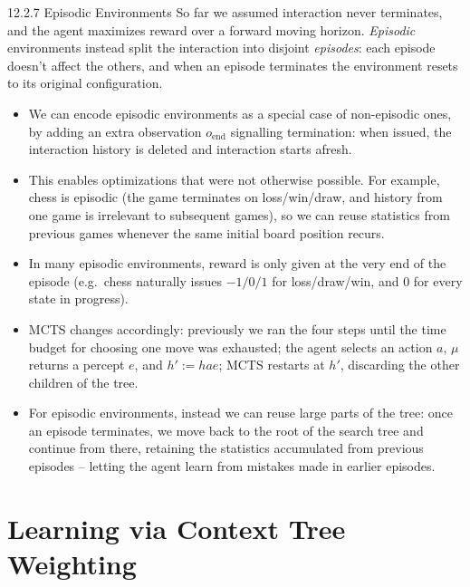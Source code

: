 \documentclass[aspectratio=169,10pt]{beamer}
\begin{document}
\begin{frame}{12.2.7 Episodic Environments}
So far we assumed interaction never terminates, and the agent maximizes reward over a
forward moving horizon. \emph{Episodic} environments instead split the interaction into
disjoint \emph{episodes}: each episode doesn't affect the others, and when an episode
terminates the environment resets to its original configuration.
\begin{itemize}
\item We can encode episodic environments as a special case of non-episodic ones, by
adding an extra observation $o_{\mathrm{end}}$ signalling termination: when issued, the
interaction history is deleted and interaction starts afresh.
\item This enables optimizations that were not otherwise possible. For example, chess is
episodic (the game terminates on loss/win/draw, and history from one game is irrelevant
to subsequent games), so we can reuse statistics from previous games whenever the same
initial board position recurs.
\item In many episodic environments, reward is only given at the very end of the episode
(e.g.\ chess naturally issues $-1/0/1$ for loss/draw/win, and $0$ for every state in
progress).
\item MCTS changes accordingly: previously we ran the four steps until the time budget for
choosing one move was exhausted; the agent selects an action $a$, $\mu$ returns a percept
$e$, and $h':=hae$; MCTS restarts at $h'$, discarding the other children of the tree.
\item For episodic environments, instead we can reuse large parts of the tree: once an
episode terminates, we move back to the root of the search tree and continue from there,
retaining the statistics accumulated from previous episodes -- letting the agent learn
from mistakes made in earlier episodes.
\end{itemize}
\end{frame}

\section{Learning via Context Tree Weighting}
\end{document}
